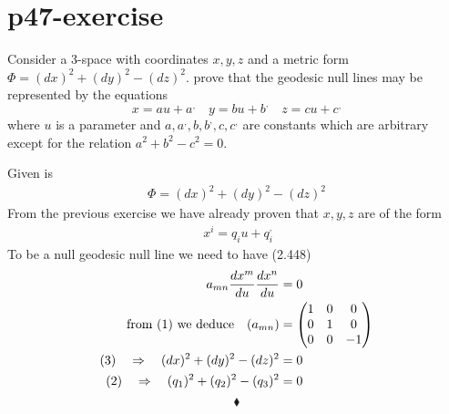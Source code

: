\section{p47-exercise }
\begin{tcolorbox}
Consider a 3-space with coordinates $x,y,z$ and a metric form $\Phi = (dx)^2+(dy)^2 - (dz)^2$. prove that the geodesic null lines may be represented by the equations
$$x = au + a^,\quad y = bu + b^, \quad z = cu + c^,$$
where $u$ is a parameter and $a, a^,,b,b^,,c,c^,$ are constants which are arbitrary except for the relation $a^2+b^2-c^2 =0$.
\end{tcolorbox}
Given is 
\begin{align}
\Phi = (dx)^2+(dy)^2 - (dz)^2
\end{align}
From the previous exercise we have already proven that $x,y,z$ are of the form
\begin{align}
\ x^i = q_i u + q_i^,
\end{align}
To be a null geodesic null line we need to have (2.448)
\begin{align}
\ a_{mn}\dv{x^m}{u}\dv{x^n}{u} &=0\\
\text{from (1) we deduce}  \quad (a_{mn}) &= \begin{pmatrix}
1& 0 & 0 \\
 0&1  & 0 \\
 0&  0& -1 \\
\end{pmatrix}\\
\text{(3)}\quad\Rightarrow\quad (dx)^2+(dy)^2 - (dz)^2 &=0\\
\text{(2)}\quad\Rightarrow\quad (q_1)^2+(q_2)^2 - (q_3)^2 &=0
\end{align}
$$\blacklozenge$$
\newpage

